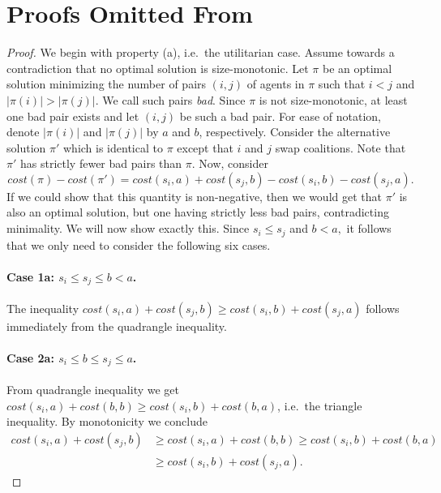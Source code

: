 \documentclass[a4paper]{article}
\newcommand{\cost}{\mathit{cost}}
\begin{document}
\appendix

\section{Proofs Omitted From }\label{app:omitted}

\sizemonotonicity*
\begin{proof} 
We begin with property (a), i.e.\ the utilitarian case. Assume towards a contradiction that no optimal solution is size-monotonic. Let $\pi$ be an optimal solution minimizing the number of pairs $(i, j)$ of agents in $\pi$ such that $i < j$ and $|\pi(i)| > |\pi(j)|$. We call such pairs \emph{bad}. Since $\pi$ is not size-monotonic, at least one bad pair exists and let $(i, j)$ be such a bad pair. For ease of notation, denote $|\pi(i)|$ and $|\pi(j)|$ by $a$ and $b$, respectively. Consider the alternative solution $\pi'$ which is identical to $\pi$ except that $i$ and $j$ swap coalitions. Note that $\pi'$ has strictly fewer bad pairs than $\pi.$
Now, consider
\[
\cost(\pi) - \cost(\pi') = \cost(s_i,a) + \cost(s_j,b) - \cost(s_i, b) - \cost(s_j,a).
\] 
If we could show that this quantity is non-negative, then we would get that $\pi'$ is also an optimal solution, but one having strictly less bad pairs, contradicting minimality. We will now show exactly this. Since $s_i \leq s_j$ and $b < a,$ it follows that we only need to consider the following six cases.

\paragraph*{Case 1a: $s_i \leq s_j \leq b < a$.}
 The inequality $\cost(s_i,a) + \cost(s_j,b) \geq \cost(s_i, b) + \cost(s_j,a)$ follows immediately from the quadrangle inequality.
\paragraph*{Case 2a: $s_i \leq b \leq s_j \leq a$.}
From quadrangle inequality we get $\cost(s_i,a) + \cost(b,b) \geq \cost(s_i,b) + \cost(b,a)$, i.e.\ the triangle inequality. By monotonicity we conclude
\begin{align*}
    \cost(s_i,a) + \cost(s_j,b) &\geq \cost(s_i,a) + \cost(b,b) \geq \cost(s_i,b) + \cost(b,a)\\
    &\geq \cost(s_i,b) + \cost(s_j,a).
\end{align*}

\end{proof}
\end{document}
